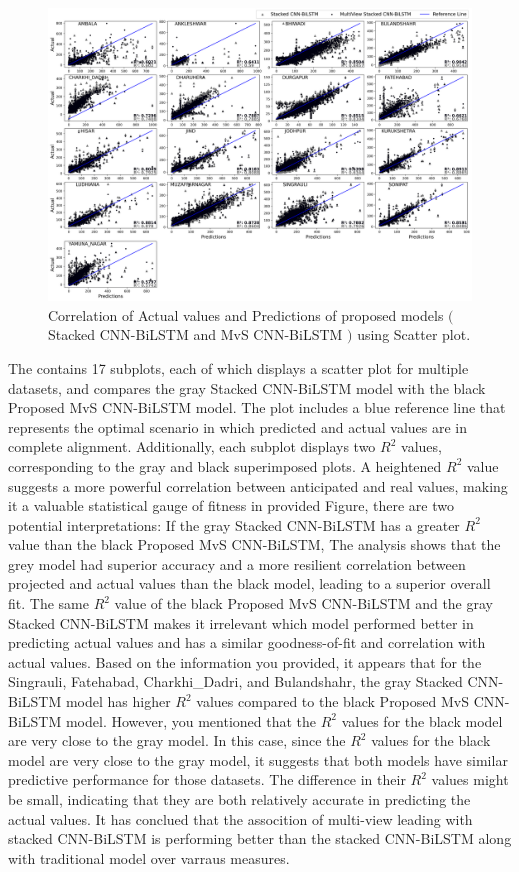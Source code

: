 \documentclass[a4paper, fleqn]{cas-sc}
\theoremstyle{definition}
\theoremstyle{remark}
\begin{document}
\begin{figure}[ht]
	\centering
		\includegraphics[scale=0.35]{Scatter_plot}
	  \caption{Correlation of Actual values and Predictions of proposed models $($Stacked CNN-BiLSTM and MvS CNN-BiLSTM $)$ using Scatter plot.}\label{Scatter}
\end{figure}
The  contains 17 subplots,  each of which displays a scatter plot for multiple datasets,  and compares the gray Stacked CNN-BiLSTM model with the black Proposed MvS CNN-BiLSTM model. The plot includes a blue reference line that represents the optimal scenario in which predicted and actual values are in complete alignment. Additionally,  each subplot displays two $R^2$ values,  corresponding to the gray and black superimposed plots. A heightened $R^2$ value suggests a more powerful correlation between anticipated and real values,  making it a valuable statistical gauge of fitness in provided Figure,  there are two potential interpretations:  If the gray Stacked CNN-BiLSTM has a greater $R^2$ value than the black Proposed MvS CNN-BiLSTM,  The analysis shows that the grey model had superior accuracy and a more resilient correlation between projected and actual values than the black model,  leading to a superior overall fit. The same $R^2$ value of the black Proposed MvS CNN-BiLSTM and the gray Stacked CNN-BiLSTM makes it irrelevant which model performed better in predicting actual values and has a similar goodness-of-fit and correlation with actual values. Based on the information you provided,  it appears that for the  Singrauli,  Fatehabad,  Charkhi\_Dadri,  and Bulandshahr,  the gray Stacked CNN-BiLSTM model has higher $R^2$ values compared to the black Proposed MvS CNN-BiLSTM model. However,  you mentioned that the $R^2$ values for the black model are very close to the gray model. In this case,  since the $R^2$ values for the black model are very close to the gray model,  it suggests that both models have similar predictive performance for those datasets. The difference in their $R^2$ values might be small,  indicating that they are both relatively accurate in predicting the actual values. It has conclued that the assocition of multi-view leading with stacked CNN-BiLSTM is performing better than the stacked CNN-BiLSTM along with traditional model over varraus measures.
\end{document}
